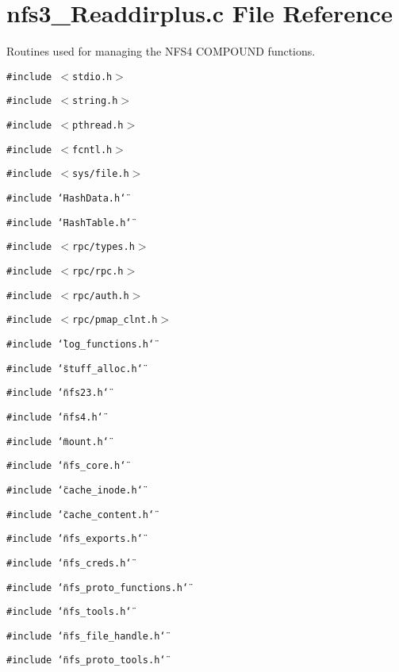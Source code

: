 \section{nfs3\_\-Readdirplus.c File Reference}
\label{nfs3__Readdirplus_8c}
Routines used for managing the NFS4 COMPOUND functions. 

{\tt \#include $<$stdio.h$>$}\par
{\tt \#include $<$string.h$>$}\par
{\tt \#include $<$pthread.h$>$}\par
{\tt \#include $<$fcntl.h$>$}\par
{\tt \#include $<$sys/file.h$>$}\par
{\tt \#include \char`\"{}Hash\-Data.h\char`\"{}}\par
{\tt \#include \char`\"{}Hash\-Table.h\char`\"{}}\par
{\tt \#include $<$rpc/types.h$>$}\par
{\tt \#include $<$rpc/rpc.h$>$}\par
{\tt \#include $<$rpc/auth.h$>$}\par
{\tt \#include $<$rpc/pmap\_\-clnt.h$>$}\par
{\tt \#include \char`\"{}log\_\-functions.h\char`\"{}}\par
{\tt \#include \char`\"{}stuff\_\-alloc.h\char`\"{}}\par
{\tt \#include \char`\"{}nfs23.h\char`\"{}}\par
{\tt \#include \char`\"{}nfs4.h\char`\"{}}\par
{\tt \#include \char`\"{}mount.h\char`\"{}}\par
{\tt \#include \char`\"{}nfs\_\-core.h\char`\"{}}\par
{\tt \#include \char`\"{}cache\_\-inode.h\char`\"{}}\par
{\tt \#include \char`\"{}cache\_\-content.h\char`\"{}}\par
{\tt \#include \char`\"{}nfs\_\-exports.h\char`\"{}}\par
{\tt \#include \char`\"{}nfs\_\-creds.h\char`\"{}}\par
{\tt \#include \char`\"{}nfs\_\-proto\_\-functions.h\char`\"{}}\par
{\tt \#include \char`\"{}nfs\_\-tools.h\char`\"{}}\par
{\tt \#include \char`\"{}nfs\_\-file\_\-handle.h\char`\"{}}\par
{\tt \#include \char`\"{}nfs\_\-proto\_\-tools.h\char`\"{}}\par
